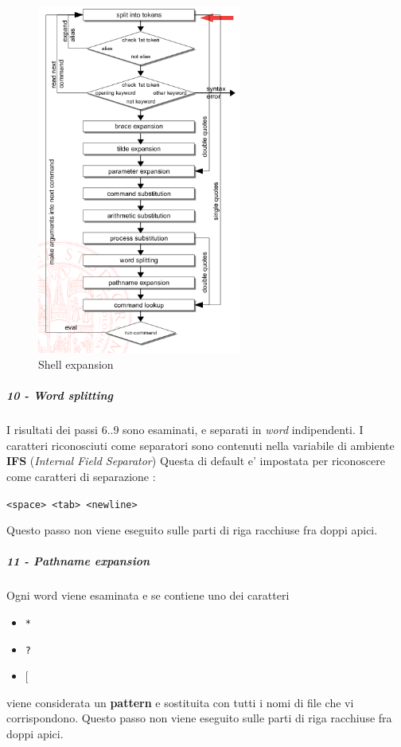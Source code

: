 \begin{figure}
	\begin{center}
		\includegraphics[width=0.6\textwidth]{img/shell-expansion.png}
		\caption{Shell expansion}
	\end{center}
\end{figure}
\subparagraph{10 - Word splitting}
I risultati dei passi 6..9 sono esaminati, e separati in \emph{word} indipendenti. I caratteri riconosciuti
come separatori sono contenuti nella variabile di ambiente \textbf{IFS} (\emph{Internal Field Separator})
Questa di default e' impostata per riconoscere come caratteri di separazione :
\begin{center}
	\texttt{<space> <tab> <newline>}
\end{center}
Questo passo non viene eseguito sulle parti di riga racchiuse fra doppi apici.


\subparagraph{11 - Pathname expansion}
Ogni word viene esaminata e se contiene uno dei caratteri

\begin{itemize}
	\item \texttt{*}
	\item \texttt{?}
	\item \texttt{$[$}
\end{itemize}
viene considerata un \textbf{pattern} e sostituita con tutti i nomi di file che vi corrispondono.
Questo passo non viene eseguito sulle parti di riga racchiuse fra doppi apici.


